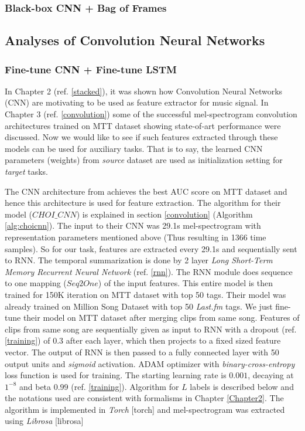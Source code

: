 \subsubsection{Black-box CNN + Bag of Frames}

\subsection{Analyses of Convolution Neural Networks}
\label{pretrained}

\subsubsection{Fine-tune CNN + Fine-tune LSTM}


In Chapter 2 (ref. \ref{stacked}), it was shown how Convolution Neural Networks (CNN) are motivating to be used as feature extractor for music signal. In Chapter 3 (ref. \ref{convolution}) some of the successful mel-spectrogram convolution architectures trained on MTT dataset showing state-of-art performance were discussed. Now we would like to see if such features extracted through these models can be used for auxiliary tasks. That is to say, the learned CNN parameters (weights) from \textit{source} dataset are used as initialization setting for \textit{target} tasks.    
\bigskip

\noindent The CNN architecture from \cite{choi_cnn} achieves the best AUC score on MTT dataset and hence this architecture is used for feature extraction. The algorithm for their model ($CHOI\_CNN$) is explained in section \ref{convolution} (Algorithm \ref{alg:choicnn}). The input to their CNN was 29.1s mel-spectrogram with representation parameters mentioned above (Thus resulting in 1366 time samples). So for our task, features are extracted every 29.1s and sequentially sent to RNN. The temporal summarization is done by 2 layer \textit{Long Short-Term Memory Recurrent Neural Network} (ref. \ref{rnn}). The RNN module does sequence to one mapping ($Seq2One$) of the input features. This entire model is then trained for 150K iteration on MTT dataset with top 50 tags. Their model was already trained on Million Song Dataset \cite{MSD} with top 50 \textit{Last.fm} tags. We just fine-tune their model on MTT dataset after merging clips from same song. Features of clips from same song are sequentially given as input to RNN with a dropout (ref. \ref{training}) of 0.3 after each layer, which then projects to a fixed sized feature vector. The output of RNN is then passed to a fully connected layer with 50 output units and \textit{sigmoid} activation. ADAM optimizer with \textit{binary-cross-entropy} loss function is used for training. The starting learning rate is $0.001$, decaying at $1^{-8}$ and beta $0.99$ (ref. \ref{training}). Algorithm for $L$ labels is described below and the notations used are consistent with formalisms in Chapter \ref{Chapter2}. The algorithm is implemented in \textit{Torch} [torch] and mel-spectrogram was extracted using \textit{Librosa} [librosa]
\bigskip 

